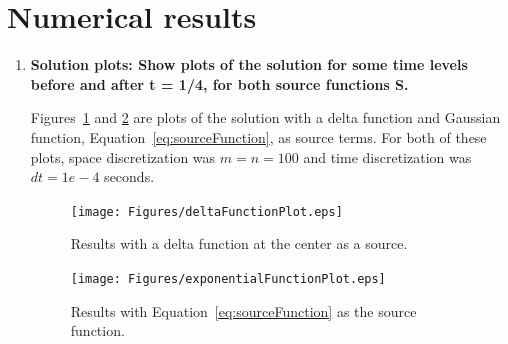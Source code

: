 

\section{Numerical results} 

\label{sec:numerical_results}
\begin{enumerate}
	\item \textbf{Solution plots: Show plots of the solution for some time levels before and after t = 1/4, for \textbf{both} source functions S.} 
	
	{\color{blue} Figures~\ref{fig:Figures_deltaFunctionPlot} and \ref{fig:Figures_exponentialFunctionPlot} are plots of the solution with a delta function and Gaussian function, Equation~\eqref{eq:sourceFunction}, as source terms. For both of these plots, space discretization was $m=n=100$ and time discretization was $dt=1e-4$ seconds.} 
	\begin{figure}
		[htbp] \centering 
		\texttt{[image: Figures/deltaFunctionPlot.eps]} \caption{Results with a delta function at the center as a source.} \label{fig:Figures_deltaFunctionPlot} 
	\end{figure}
	
	\begin{figure}
		[htbp] \centering 
		\texttt{[image: Figures/exponentialFunctionPlot.eps]} \caption{Results with Equation~\eqref{eq:sourceFunction} as the source function.} \label{fig:Figures_exponentialFunctionPlot} 
	\end{figure}%
	

\end{enumerate}
